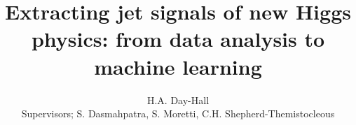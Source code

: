 \documentclass{article}
\begin{document}
\title{Extracting jet signals of new Higgs physics: from data analysis to machine learning}
\author{H.A. Day-Hall \\ {\small Supervisors; S. Dasmahpatra, S. Moretti, C.H. Shepherd-Themistocleous}}
	
	\maketitle
	
	\tableofcontents
    \FloatBarrier
     
    \FloatBarrier
    
    
    \FloatBarrier
    \FloatBarrier
    
    \FloatBarrier
    
    \FloatBarrier
    
    \FloatBarrier
    
    \FloatBarrier
    
    \FloatBarrier
    
    \FloatBarrier
    
    
    \printbibliography	
\end{document}
